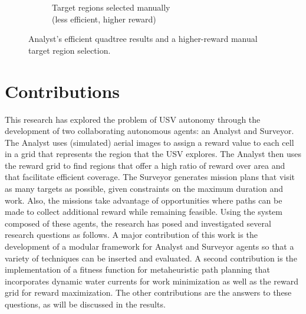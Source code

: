 \documentclass{tamuccthesis}
\begin{document}
\begin{figure}[H]
\begin{subfigure}[b]{0.475\textwidth}
        \caption{Target regions selected manually \\ (less efficient, higher reward)}   
        \label{fig:quadtree_b}
    \end{subfigure}
    \caption[Quadtree algorithm: efficient but sub-optimal.]{Analyst's efficient quadtree results and a higher-reward manual target region selection.}
    \label{fig:quadtree_compare}
\end{figure}

\section{Contributions}
\label{section:contributions}

This research has explored the problem of USV autonomy through the development of two collaborating autonomous agents: an Analyst and Surveyor. The Analyst uses (simulated) aerial images to assign a reward value to each cell in a grid that represents the region that the USV explores. The Analyst then uses the reward grid to find regions that offer a high ratio of reward over area and that facilitate efficient coverage. The Surveyor generates mission plans that visit as many targets as possible, given constraints on the maximum duration and work. Also, the missions take advantage of opportunities where paths can be made to collect additional reward while remaining feasible. Using the system composed of these agents, the research has posed and investigated several research questions as follows. A major contribution of this work is the development of a modular framework for Analyst and Surveyor agents so that a variety of techniques can be inserted and evaluated. A second contribution is the implementation of a fitness function for metaheuristic path planning that incorporates dynamic water currents for work minimization as well as the reward grid for reward maximization. The other contributions are the answers to these questions, as will be discussed in the results. 
\end{document}
